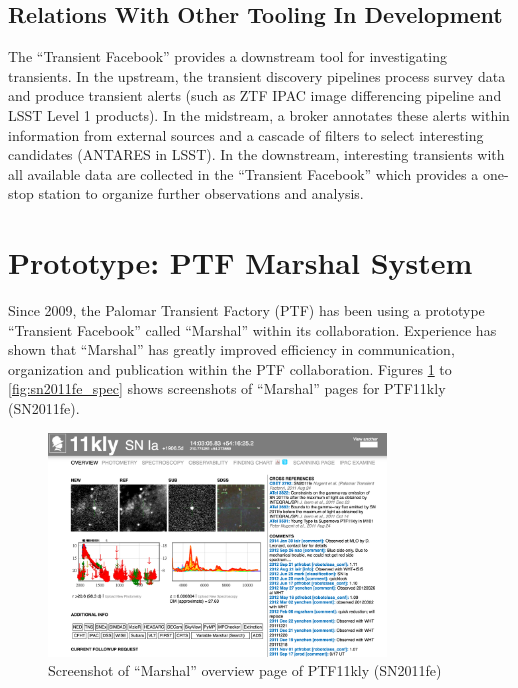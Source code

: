 \documentclass[11pt]{article}
\begin{document}
\subsection{Relations With Other Tooling In Development}

The ``Transient Facebook'' provides a downstream tool for
investigating transients. In the upstream, the transient discovery
pipelines process survey data and produce transient alerts (such as
ZTF IPAC image differencing pipeline and LSST Level 1 products). In
the midstream, a broker annotates these alerts within information from
external sources and a cascade of filters to select interesting
candidates (ANTARES in LSST). In the downstream, interesting
transients with all available data are collected in the ``Transient
Facebook'' which provides a one-stop station to organize further
observations and analysis.

\section{Prototype: PTF Marshal System}
\label{sec:marshal}

Since 2009, the Palomar Transient Factory (PTF) has been using a prototype
``Transient Facebook'' called ``Marshal'' within its collaboration. Experience
has shown that ``Marshal'' has greatly improved efficiency in communication,
organization and publication within the PTF collaboration. Figures \ref{fig:sn2011fe_overview}
to \ref{fig:sn2011fe_spec} shows screenshots of ``Marshal'' pages for PTF11kly
(SN2011fe). 

\begin{figure}[htb]
  \centering
  \includegraphics[width=0.8\textwidth]{view_source.png}
  \caption{Screenshot of ``Marshal'' overview page of PTF11kly (SN2011fe)}
  \label{fig:sn2011fe_overview}
\end{figure}
\end{document}
